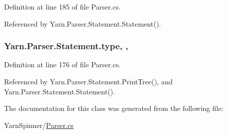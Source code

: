 Definition at line 185 of file Parser.\-cs.



Referenced by Yarn.\-Parser.\-Statement.\-Statement().

\hypertarget{a00166_aa3fa0eb260e412720562ce06b7dc06fe}{
\subsubsection[{type}]{ Yarn.\-Parser.\-Statement.\-type\hspace{0.3cm}{\ttfamily [get]}, {\ttfamily [set]}, {\ttfamily [package]}}}\label{a00166_aa3fa0eb260e412720562ce06b7dc06fe}


Definition at line 176 of file Parser.\-cs.



Referenced by Yarn.\-Parser.\-Statement.\-Print\-Tree(), and Yarn.\-Parser.\-Statement.\-Statement().



The documentation for this class was generated from the following file\-:\begin{DoxyCompactItemize}
\item 
Yarn\-Spinner/\hyperlink{a00313}{Parser.\-cs}\end{DoxyCompactItemize}

